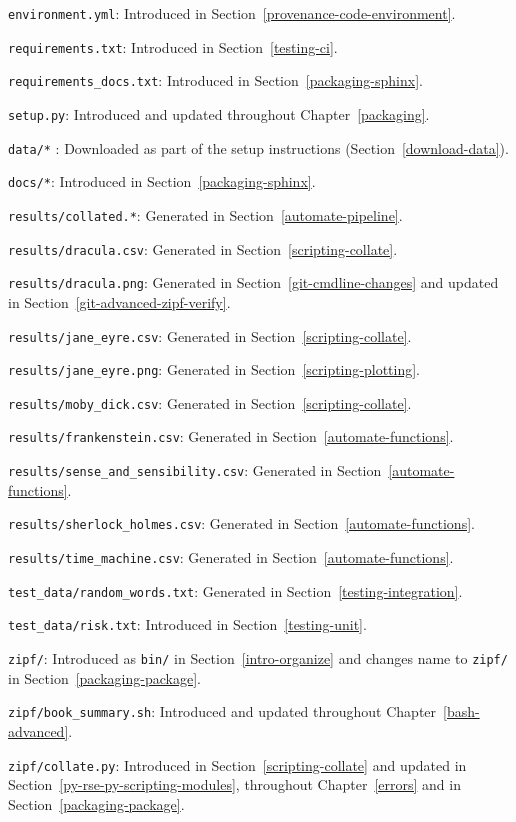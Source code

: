 \documentclass[
]{krantz}
\begin{document}
\texttt{environment.yml}: Introduced in Section~\ref{provenance-code-environment}.

\texttt{requirements.txt}: Introduced in Section~\ref{testing-ci}.

\texttt{requirements\_docs.txt}: Introduced in Section~\ref{packaging-sphinx}.

\texttt{setup.py}: Introduced and updated throughout Chapter~\ref{packaging}.

\texttt{data/*} : Downloaded as part of the setup instructions (Section~\ref{download-data}).

\texttt{docs/*}: Introduced in Section~\ref{packaging-sphinx}.

\texttt{results/collated.*}: Generated in Section~\ref{automate-pipeline}.

\texttt{results/dracula.csv}: Generated in Section~\ref{scripting-collate}.

\texttt{results/dracula.png}: Generated in Section~\ref{git-cmdline-changes} and updated in Section~\ref{git-advanced-zipf-verify}.

\texttt{results/jane\_eyre.csv}: Generated in Section~\ref{scripting-collate}.

\texttt{results/jane\_eyre.png}: Generated in Section~\ref{scripting-plotting}.

\texttt{results/moby\_dick.csv}: Generated in Section~\ref{scripting-collate}.

\texttt{results/frankenstein.csv}: Generated in Section~\ref{automate-functions}.

\texttt{results/sense\_and\_sensibility.csv}: Generated in Section~\ref{automate-functions}.

\texttt{results/sherlock\_holmes.csv}: Generated in Section~\ref{automate-functions}.

\texttt{results/time\_machine.csv}: Generated in Section~\ref{automate-functions}.

\texttt{test\_data/random\_words.txt}: Generated in Section~\ref{testing-integration}.

\texttt{test\_data/risk.txt}: Introduced in Section~\ref{testing-unit}.

\texttt{zipf/}: Introduced as \texttt{bin/} in Section~\ref{intro-organize} and
changes name to \texttt{zipf/} in Section~\ref{packaging-package}.

\texttt{zipf/book\_summary.sh}: Introduced and updated throughout Chapter~\ref{bash-advanced}.

\texttt{zipf/collate.py}: Introduced in Section~\ref{scripting-collate} and
updated in Section~\ref{py-rse-py-scripting-modules},
throughout Chapter~\ref{errors} and in Section~\ref{packaging-package}.
\end{document}
